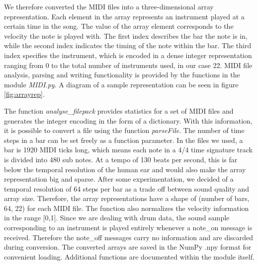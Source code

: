 \documentclass[journal]{Imperial_lab_report}
\begin{document}
We therefore converted the MIDI files into a three-dimensional array representation. Each element in the array represents an instrument played at a certain time in the song. The value of the array element corresponds to the velocity the note is played with. The first index describes the bar the note is in, while the second index indicates the timing of the note within the bar. The third index specifies the instrument, which is encoded in a dense integer representation ranging from 0 to the total number of instruments used, in our case 22. MIDI file analysis, parsing and writing functionality is provided by the functions in the module \emph{MIDI.py}. A diagram of a sample representation can be seen in figure \ref{fig:arrayrep}.

The function \emph{analyse\_filepack} provides statistics for a set of MIDI files and generates the integer encoding in the form of a dictionary. With this information, it is possible to convert a file using the function \emph{parseFile}. The number of time steps in a bar can be set freely as a function parameter. In the files we used, a bar is 1920 MIDI ticks long, which means each note in a 4/4 time signature track is divided into 480 sub notes. At a tempo of 130 beats per second, this is far below the temporal resolution of the human ear and would also make the array representation big and sparse. After some experimentation, we decided of a temporal resolution of 64 steps per bar as a trade off between sound quality and array size. Therefore, the array representations have a shape of (number of bars, 64, 22) for each MIDI file. The function also normalizes the velocity information in the range [0,1]. Since we are dealing with drum data, the sound sample corresponding to an instrument is played entirely whenever a note\_on message is received. Therefore the note\_off messages carry no information and are discarded during conversion. The converted arrays are saved in the NumPy .npy format for convenient loading. Additional functions are documented within the module itself.
\end{document}

